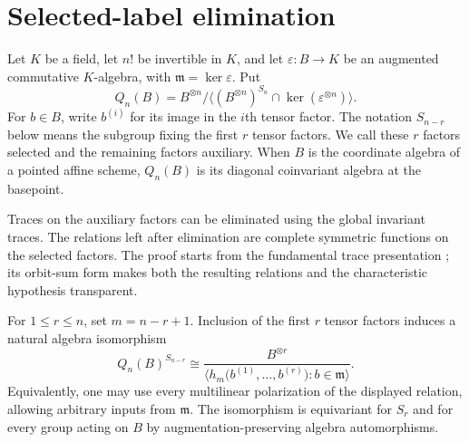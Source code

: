 \section{Selected-label elimination}\label{sec:selected-quotients}

Let $K$ be a field, let $n!$ be invertible in $K$, and let
$\varepsilon:B\to K$ be an augmented commutative $K$-algebra, with
$\mathfrak m=\ker\varepsilon$.  Put
\[
 Q_n(B)=B^{\otimes n}/
  \big\langle(B^{\otimes n})^{S_n}\cap
                  \ker(\varepsilon^{\otimes n})\big\rangle.
\]
For $b\in B$, write $b^{(i)}$ for its image in the $i$th tensor
factor.  The notation $S_{n-r}$ below means the subgroup fixing the
first $r$ tensor factors.  We call these $r$ factors selected and
the remaining factors auxiliary.  When $B$ is the coordinate algebra
of a pointed affine scheme, $Q_n(B)$ is its diagonal coinvariant
algebra at the basepoint.

Traces on the auxiliary factors can be eliminated using the global invariant traces.
The relations left after elimination are complete symmetric
functions on the selected factors.  The proof starts from the
fundamental trace presentation \cite[Theorem~1]{Domokos2017}; its
orbit-sum form makes both the resulting relations and the
characteristic hypothesis transparent.

\begin{theorem}
\label{thm:universal-selected-trace-presentation}
For $1\le r\le n$, set $m=n-r+1$.  Inclusion of the first $r$
tensor factors induces a natural algebra isomorphism
\begin{equation}\label{eq:universal-selected-trace-presentation}
 Q_n(B)^{S_{n-r}}
 \cong
 \frac{B^{\otimes r}}
 {\big\langle
     h_m\bigl(b^{(1)},\ldots,b^{(r)}\bigr):b\in\mathfrak m
       \big\rangle}.
\end{equation}
Equivalently, one may use every multilinear polarization of the
displayed relation, allowing arbitrary inputs from $\mathfrak m$.
The isomorphism is equivariant for $S_r$ and for every group acting
on $B$ by augmentation-preserving algebra automorphisms.
\end{theorem}

